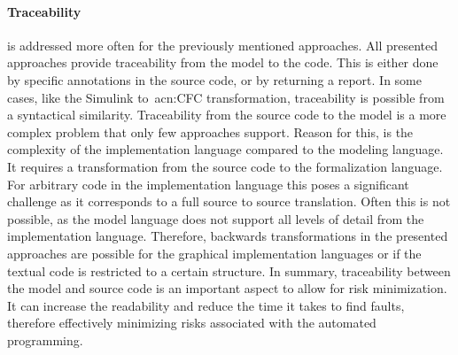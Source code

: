 \paragraph{Traceability} is addressed more often for the previously mentioned approaches.
All presented approaches provide traceability from the model to the code.
This is either done by specific annotations in the source code, or by returning a report.
In some cases, like the Simulink to~\acrshort{acn:CFC} transformation, traceability is possible from a syntactical similarity.
Traceability from the source code to the model is a more complex problem that only few approaches support.
Reason for this, is the complexity of the implementation language compared to the modeling language.
It requires a transformation from the source code to the formalization language.
For arbitrary code in the implementation language this poses a significant challenge as it corresponds to a full source to source translation.
Often this is not possible, as the model language does not support all levels of detail from the implementation language.
Therefore, backwards transformations in the presented approaches are possible for the graphical implementation languages or if the textual code is restricted to a certain structure.
In summary, traceability between the model and source code is an important aspect to allow for risk minimization.
It can increase the readability and reduce the time it takes to find faults, therefore effectively minimizing risks associated with the automated programming.

